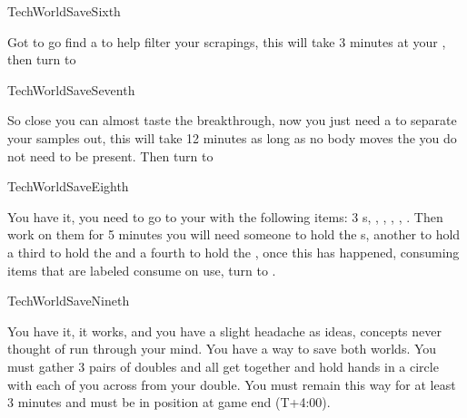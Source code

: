 \documentclass[greennotebook]{guildcamp3} %
\begin{document}
\begin{page}{TechWorldSaveSixth}
	
	 Got to go find a  \iSieve{} to help filter your scrapings, this will take 3 minutes at your \sTechWorkbench{}, then turn to  
	
\end{page}

\begin{page}{TechWorldSaveSeventh}
	
	So close you can almost taste the breakthrough, now you just need a \iCentrifuge{} to separate your samples out, this will take 12 minutes as long as no body moves the \iCentrifuge{} you do not need to be present. Then turn to  
	
\end{page}

\begin{page}{TechWorldSaveEighth}
	
	 You have it, you need to go to your \sTechWorkbench{} with the following items: 3 \iTFResistor{}s, \iScrapMetal{}, \iCog{}, \iCircuitBoard{}, \iFlashlight{}, \iMultitool{}. Then work on them for 5 minutes you will need someone to hold the \iTFResistor{}s, another to hold  \iScrapMetal{} a third to hold the \iCog{} and a fourth to hold the \iCircuitBoard{}, once this has happened, consuming items that are labeled consume on use, turn to .
	
\end{page}

\begin{page}{TechWorldSaveNineth}
	
	You have it, it works, and you have a slight headache as ideas, concepts never thought of run through your mind. You have a way to save both worlds.  You must gather 3 pairs of doubles and all get together and hold hands in a circle with each of you across from your double. You must remain this way for at least 3 minutes and must be in position at game end (T+4:00).
	
\end{page}

\endnotebook
\end{document}
